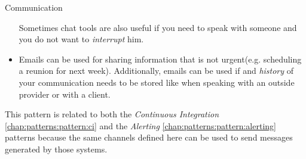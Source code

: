 \begin{pattern}{Communication}
\begin{itemize}
            Sometimes chat tools are also useful if you need to speak with someone and you do not want to \textit{interrupt} him.
            \item Emails can be used for sharing information that is not urgent(e.g. scheduling a reunion for next week). Additionally, emails can be used if and \textit{history} of your communication needs to be stored like when speaking with an outside provider or with a client.
        \end{itemize}
        \related
        This pattern is related to both the \textit{Continuous Integration} \ref{chap:patterns:pattern:ci} and the \textit{Alerting} \ref{chap:patterns:pattern:alerting} patterns because the same channels defined here can be used to send messages generated by those systems.
\end{pattern}













